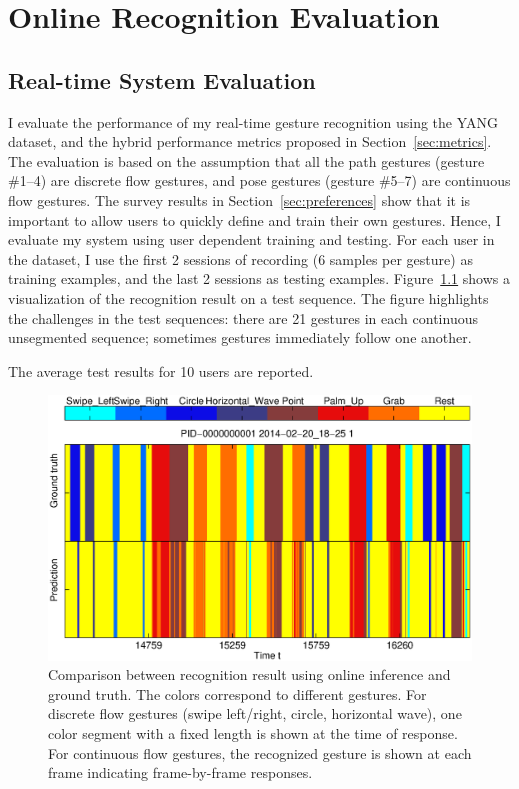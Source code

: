 \chapter{Online Recognition Evaluation}\label{sec:evaluation}


\section{Real-time System Evaluation}
I evaluate the performance of my real-time gesture recognition using the YANG
dataset, and the hybrid performance
metrics proposed in Section~\ref{sec:metrics}. The evaluation is based on the
assumption that all the path gestures (gesture \#1--4) are
discrete flow gestures, and pose gestures (gesture \#5--7) are continuous flow
gestures.
The survey results in Section~\ref{sec:preferences} show that it is
important to allow users to quickly define and train their own gestures. Hence,
I evaluate my system using user dependent training and testing. For each user
in the dataset, I use the first 2 sessions of recording (6 samples per gesture)
as training examples, and the last 2 sessions as testing examples.
Figure~\ref{fig:recog-result} shows a visualization of the recognition result on
a test sequence. The figure highlights the challenges in the test sequences:
there are 21 gestures in each continuous unsegmented sequence; sometimes
gestures immediately follow one another.

The average test results for 10 users are reported.

\begin{figure}[thb]
\centering
\includegraphics[trim=10mm 5mm 10mm 5mm, clip,
width=\columnwidth]{figures/recog_result_m3.eps}
\caption{Comparison between recognition result using online inference
and ground truth.
The colors correspond to different gestures. For discrete flow gestures
(swipe left/right, circle, horizontal wave), one color segment with a fixed
length is shown at the time of response. For continuous flow gestures, the
recognized gesture is shown at each frame indicating frame-by-frame responses.}
\label{fig:recog-result}
\end{figure}

